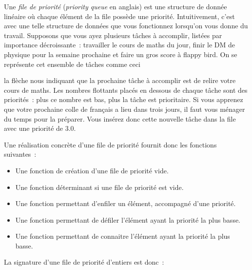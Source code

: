 \documentclass{magnoliaold}
\begin{document}
Une \emph{file de priorité} (\emph{priority queue} en anglais) est une structure de donnée linéaire où chaque élément de la file possède une priorité. Intuitivement, c'est avec une
telle structure de données que vous fonctionnez lorsqu'on vous donne du travail. 
Supposons que vous ayez plusieurs tâches à accomplir, listées par importance décroissante~:
travailler le cours de maths du jour, finir le DM de physique pour la
semaine prochaine et faire un gros score à flappy bird. On se représente cet ensemble de
tâches comme ceci
\begin{center}
\end{center}

\noindent
la flèche nous indiquant que la prochaine tâche à accomplir est de relire votre cours de
maths. Les nombres flottants placés en dessous de chaque tâche sont des priorités~: plus ce nombre
est bas, plus la tâche est prioritaire. Si vous apprenez que votre prochaine colle de
français a lieu dans trois jours, il faut vous ménager du temps
pour la préparer. Vous insérez donc cette nouvelle tâche dans la file avec une
priorité de $3.0$.  

\begin{center}
\end{center}
Une réalisation concrète d'une file de priorité fournit donc les
fonctions suivantes~:
\begin{itemize}
\item Une fonction de création d'une file de priorité vide.
\item Une fonction déterminant si une file de priorité est vide.
\item Une fonction permettant d'enfiler un élément, accompagné d'une priorité.
\item Une fonction permettant de défiler l'élément ayant la priorité la plus basse.
\item Une fonction permettant de connaitre l'élément ayant la priorité la plus basse.
\end{itemize}
La signature d'une file de priorité d'entiers est donc~:
\end{document}
